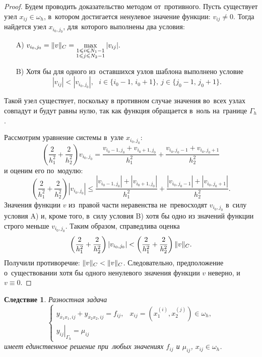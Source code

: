 \documentclass[11pt,a4paper,twoside,listtotoc,bibtotoc]{report}
\numberwithin{equation}{section}
\theoremstyle{definition}
\theoremstyle{plain}
\newtheorem*{cons*}{Следствие}
\DeclarePairedDelimiter\norm{\lVert}{\rVert}
\begin{document}
\begin{proof}
    Будем проводить доказательство методом от~противного. Пусть существует
    узел $x_{ij} \in \omega_h$, в~котором достигается ненулевое значение функции:
    $
        v_{ij} \ne 0.
    $
    Тогда найдется
    узел $x_{i_0,j_0}$, для~которого выполнены два условия:
    \begin{enumerate}
        \item[A)] $v_{i_0,j_0} = \norm{v}_C=
        \max\limits_{\substack{1 \leqslant i \leqslant N_1 - 1\\
        1 \leqslant j \leqslant N_2 - 1}} |v_{ij}|.$
        \item[B)] Хотя бы для одного из~оставшихся узлов шаблона выполнено
            условие
        $$
            |v_{ij}| < |v_{i_0,j_0}|,
            ~~~i\in\{i_0-1,\,i_0+1\},~j\in\{j_0-1,\,j_0+1\}.
        $$
    \end{enumerate}

    Такой узел существует, поскольку в противном случае значения во~всех узлах
    совпадут и будут равны нулю, так как функция обращается в~ноль
    на~границе $\Gamma_h$.

    Рассмотрим уравнение системы в~узле $x_{i_0, j_0}$:
    $$
        \left(\frac{2}{h_1^2} + \frac{2}{h_2^2}\right)v_{i_0, j_0} =
        \frac{v_{i_0-1,j_0}+v_{i_0+1,j_0}}{h_1^2}+
        \frac{v_{i_0, j_0-1}+v_{i_0, j_0 + 1}}{h_2^2}
    $$
    и оценим его по~модулю:
    $$
        \left(\frac{2}{h_1^2} + \frac{2}{h_2^2}\right)|v_{i_0, j_0}| \leqslant
        \frac{|v_{i_0-1,j_0}|+|v_{i_0+1,j_0}|}{h_1^2}+
        \frac{|v_{i_0, j_0-1}|+|v_{i_0, j_0 + 1}|}{h_2^2}.
    $$
    Значения функции $v$ из~правой части неравенства не~превосходят $v_{i_0,j_0}$
    в~силу условия A) и, кроме того, в~силу условия B) хотя бы одно из значений
    функции строго меньше $v_{i_0,j_0}$. Таким образом, справедлива оценка
    $$
        \left(\frac{2}{h_1^2}+\frac{2}{h_2^2}\right)|v_{i_0,j_0}|<
        \left(\frac{2}{h_1^2}+\frac{2}{h_2^2}\right)\norm{v}_C.
    $$
    Получили противоречие: $\norm{v}_C < \norm{v}_C$. Следовательно,
    предположение о~существовании хотя бы одного ненулевого значения функции
    $v$ неверно, и $v \equiv 0$.
\end{proof}
%
%
\begin{cons*}
    Разностная задача
    $$
        \begin{cases}
            y_{\overline{x}_1x_1,ij}+y_{\overline{x}_2x_2,ij}=f_{ij}, &
                x_{ij} = \left(x_1^{(i)}, x_2^{(j)}\right) \in \omega_h,\\
            \left.y_{ij}\right\vert_{\Gamma_h} = \mu_{ij} &
        \end{cases}
    $$
    имеет единственное решение при~любых значениях $f_{ij}$ и $\mu_{ij}$,
    $x_{ij}\in\omega_h$.
\end{cons*}
\end{document}
